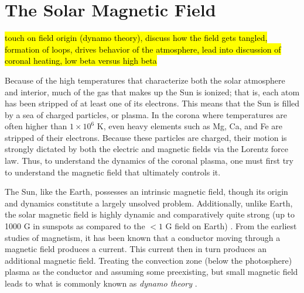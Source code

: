 \section{The Solar Magnetic Field}
\label{sec:magnetic_field}
\hl{touch on field origin (dynamo theory), discuss how the field gets tangled, formation of loops, drives behavior of the atmosphere, lead into discussion of coronal heating, low beta versus high beta}
%
\par Because of the high temperatures that characterize both the solar atmosphere and interior, much of the gas that makes up the Sun is ionized; that is, each atom has been stripped of at least one of its electrons. This means that the Sun is filled by a sea of charged particles, or plasma. In the corona where temperatures are often higher than $1\times10^6$ K, even heavy elements such as Mg, Ca, and Fe are stripped of their electrons. Because these particles are charged, their motion is strongly dictated by both the electric and magnetic fields via the Lorentz force law. Thus, to understand the dynamics of the coronal plasma, one must first try to understand the magnetic field that ultimately controls it.
%
\par The Sun, like the Earth, possesses an intrinsic magnetic field, though its origin and dynamics constitute a largely unsolved problem. Additionally, unlike Earth, the solar magnetic field is highly dynamic and comparatively quite strong (up to 1000 G in sunspots as compared to the $<1$ G field on Earth) \citep{aschwanden_physics_2006}. From the earliest studies of magnetism, it has been known that a conductor moving through a magnetic field produces a current. This current then in turn produces an additional magnetic field. Treating the convection zone (below the photosphere) plasma as the conductor and assuming some preexisting, but small magnetic field leads to what is commonly known as \textit{dynamo theory} \citep{golub_solar_2010}.
%
